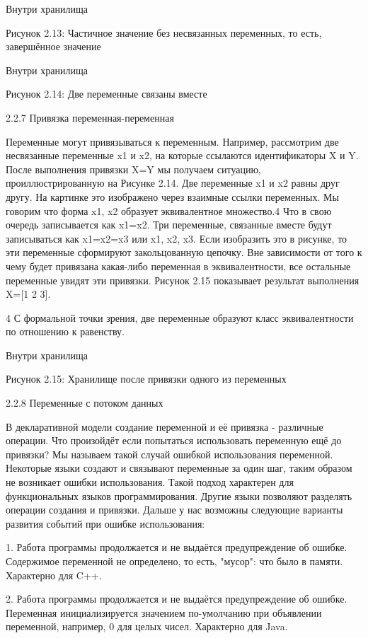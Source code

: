 Внутри хранилища

Рисунок 2.13: Частичное значение без несвязанных переменных, то есть, завершённое значение

Внутри хранилища

Рисунок 2.14: Две переменные связаны вместе

2.2.7 Привязка переменная-переменная

Переменные могут привязываться к переменным. Например, рассмотрим две несвязанные переменные x1 и x2, на которые ссылаются идентификаторы X и Y. После выполнения привязки X=Y мы получаем ситуацию, проиллюстрированную на Рисунке 2.14. Две переменные x1 и x2 равны друг другу. На картинке это изображено через взаимные ссылки переменных. Мы говорим что форма {x1, x2} образует эквивалентное множество.4 Что в свою очередь записывается как x1=x2. Три переменные, связанные вместе будут записываться как x1=x2=x3 или {x1, x2, x3}. Если изобразить это в рисунке, то эти переменные сформируют закольцованную цепочку. Вне зависимости от того к чему будет привязана какая-либо переменная в эквивалентности, все остальные переменные увидят эти привязки. Рисунок 2.15 показывает результат выполнения X=[1 2 3].

4 С формальной точки зрения, две переменные образуют класс эквивалентности по отношению к равенству.

Внутри хранилища

Рисунок 2.15: Хранилище после привязки одного из переменных

2.2.8 Переменные с потоком данных

В декларативной модели создание переменной и её привязка - различные операции. Что произойдёт если попытаться использовать переменную ещё до привязки? Мы называем такой случай ошибкой использования переменной. Некоторые языки создают и связывают переменные за один шаг, таким образом не возникает ошибки использования. Такой подход характерен для функциональных языков программирования. Другие языки позволяют разделять операции создания и привязки. Дальше у нас возможны следующие варианты развития событий при ошибке использования:

1. Работа программы продолжается и не выдаётся предупреждение об ошибке. Содержимое переменной не определено, то есть, "мусор": что было в памяти. Характерно для C++.

2. Работа программы продолжается и не выдаётся предупреждение об ошибке. Переменная инициализируется значением по-умолчанию при объявлении переменной, например, 0 для целых чисел. Характерно для Java.

